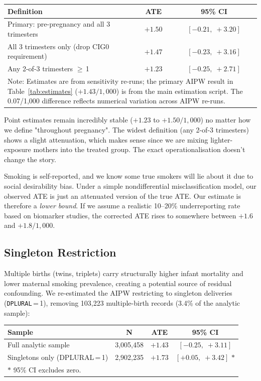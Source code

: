\documentclass[11pt]{article}
\begin{document}
\begin{center}
\small
\begin{tabular}{lcc}
\toprule
\textbf{Definition} & \textbf{ATE} & \textbf{95\% CI} \\
\midrule
Primary: pre-pregnancy and all 3 trimesters        & $+1.50$ & $[-0.21,\;+3.20]$ \\
All 3 trimesters only (drop CIG0 requirement)      & $+1.47$ & $[-0.23,\;+3.16]$ \\
Any 2-of-3 trimesters $\geq$\,1                    & $+1.23$ & $[-0.25,\;+2.71]$ \\
\bottomrule
\multicolumn{3}{p{9.5cm}}{\footnotesize Note: Estimates are from sensitivity re-runs; the primary AIPW result in Table~\ref{tab:estimates} ($+1.43/1{,}000$) is from the main estimation script. The 0.07/1{,}000 difference reflects numerical variation across AIPW re-runs.}
\end{tabular}
\end{center}

Point estimates remain incredibly stable ($+1.23$ to $+1.50/1{,}000$) no matter
how we define "throughout pregnancy". The widest definition (any 2-of-3 trimesters)
shows a slight attenuation, which makes sense since we are mixing lighter-exposure
mothers into the treated group. The exact operationalisation doesn't change the
story.

Smoking is self-reported, and we know some true smokers will lie about it due
to social desirability bias. Under a simple nondifferential misclassification
model, our observed ATE is just an attenuated version of the true ATE. Our
estimate is therefore a \emph{lower bound}. If we assume a realistic 10--20\%
underreporting rate based on biomarker studies, the corrected ATE rises to
somewhere between $+1.6$ and $+1.8/1{,}000$.

\subsection{Singleton Restriction}

Multiple births (twins, triplets) carry structurally higher infant mortality
and lower maternal smoking prevalence, creating a potential source of residual
confounding. We re-estimated the AIPW restricting to singleton deliveries
(\texttt{DPLURAL}\,=\,1), removing 103,223 multiple-birth records (3.4\% of
the analytic sample):

\begin{center}
\small
\begin{tabular}{lccc}
\toprule
\textbf{Sample} & \textbf{N} & \textbf{ATE} & \textbf{95\% CI} \\
\midrule
Full analytic sample         & 3,005,458 & $+1.43$ & $[-0.25,\;+3.11]$ \\
Singletons only (DPLURAL\,=\,1) & 2,902,235 & $+1.73$ & $[+0.05,\;+3.42]$ $*$ \\
\bottomrule
\multicolumn{4}{l}{$*$ 95\% CI excludes zero.}
\end{tabular}
\end{center}
\end{document}
